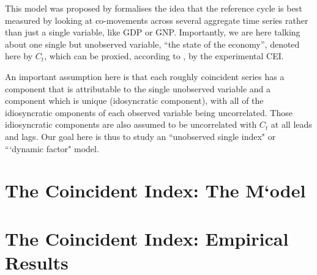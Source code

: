 \documentclass[12pt]{article}
\begin{document}
	\maketitle
	This model was proposed by   formalises the idea that  the reference cycle is best measured  by looking at co-movements  across several aggregate time series rather than just a single variable, like GDP or  GNP. Importantly, we are here talking about one single but unobserved variable, ``the state of the economy'', denoted here by $C_t$, which can be proxied, according to \cite{stock1988probability, stock&watson1989indexes}, by the experimental CEI.
	
	An important assumption here is that each roughly coincident series has a component that is attributable to the single unobserved variable and a component which is unique  (idosyncratic component), with all of the idiosyncratic omponents of each observed variable being uncorrelated. Those idiosyncratic components are also assumed to be uncorrelated with $C_t$ at all leads and lags. Our goal here is thus to study an ``unobserved single index" or ```dynamic factor" model.
	
	\section{The Coincident Index: The M`odel }
	
	
	
	\section{The Coincident Index: Empirical Results}
	
	


%
%	
%	
	
%	
	\newpage
	
	
\end{document}
